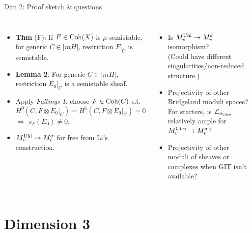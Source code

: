 \documentclass[8pt]{beamer} %
\begin{document}
\begin{frame}[fragile]{Dim 2: Proof sketch \& questions}
\begin{columns}[t]
        \begin{itemize}
            \item<6-> \textbf{Thm} (F): If $F \in \mathrm{Coh}(X)$ is $\mu$-semistable, for generic $C \in |m H|$, restriction $F|_C$ is semistable.
            \item<7-> \textbf{Lemma 2}: For generic $C \in |m H|$, restriction $E_0|_C$ is a semistable sheaf.
            \item<8-> Apply \textit{Faltings 1}: choose $F \in \mathrm{Coh}(C)$ s.t. 
            \[ H^0(C, F \otimes E_0|_C) = H^1(C, F \otimes E_0|_C) = 0 \]
            $\Rightarrow$ $s_F(E_0) \neq 0$.
            \item<9-> $M^{\text{Uhl}}_v \to M^\sigma_v$ for free from Li's construction.
        \end{itemize}
        \begin{itemize}
            \item<11-> Is $M^{\text{Uhl}}_v \to M^\sigma_v$ isomorphism? \\ {\footnotesize (Could have different singularities/non-reduced structure.)}
            \item<12-> Projectivity of other Bridgeland moduli spaces? For starters, is $\mathcal{L}_{\sigma_\text{Gies}}$ relatively ample for $M^{\text{Gies}}_v \to M^\sigma_v$?
            \item<13-> Projectivity of other moduli of sheaves or complexes when GIT isn't available?
        \end{itemize}
    \end{columns}
\end{frame}

\section{Dimension 3}
\end{document}
